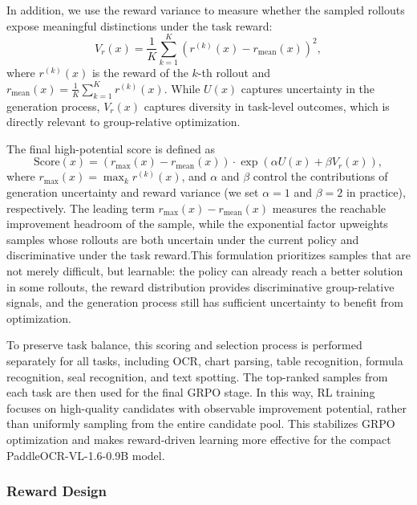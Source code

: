 \documentclass[11pt, a4paper,logo,  copyright, nonumbering]{paddleocr}
\begin{document}
In addition, we use the reward variance to measure whether the sampled rollouts expose meaningful distinctions under the task reward:
\begin{equation}
V_r(x)
=
\frac{1}{K}
\sum_{k=1}^{K}
\left(
r^{(k)}(x) - r_{\mathrm{mean}}(x)
\right)^2,
\end{equation}
where \(r^{(k)}(x)\) is the reward of the \(k\)-th rollout and \(r_{\mathrm{mean}}(x)=\frac{1}{K}\sum_{k=1}^{K}r^{(k)}(x)\). While \(U(x)\) captures uncertainty in the generation process, \(V_r(x)\) captures diversity in task-level outcomes, which is directly relevant to group-relative optimization.

The final high-potential score is defined as
\begin{equation}
\mathrm{Score}(x)
=
\left(r_{\max}(x)-r_{\mathrm{mean}}(x)\right)
\cdot
\exp\left(\alpha U(x)+\beta V_r(x)\right),
\end{equation}
where \(r_{\max}(x)=\max_{k} r^{(k)}(x)\), and \(\alpha\) and \(\beta\) control the contributions of generation uncertainty and reward variance (we set \(\alpha = 1\) and \(\beta = 2\) in practice), respectively. The leading term \(r_{\max}(x)-r_{\mathrm{mean}}(x)\) measures the reachable improvement headroom of the sample, while the exponential factor upweights samples whose rollouts are both uncertain under the current policy and discriminative under the task reward.This formulation prioritizes samples that are not merely difficult, but learnable: the policy can already reach a better solution in some rollouts, the reward distribution provides discriminative group-relative signals, and the generation process still has sufficient uncertainty to benefit from optimization.

To preserve task balance, this scoring and selection process is performed separately for all tasks, including OCR, chart parsing, table recognition, formula recognition, seal recognition, and text spotting. The top-ranked samples from each task are then used for the final GRPO stage. In this way, RL training focuses on high-quality candidates with observable improvement potential, rather than uniformly sampling from the entire candidate pool. This stabilizes GRPO optimization and makes reward-driven learning more effective for the compact PaddleOCR-VL-1.6-0.9B model.

\subsubsection{Reward Design}
\end{document}
